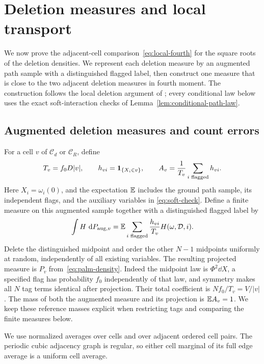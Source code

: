 \section{Deletion measures and local transport}
\label{sec:local-palm}

We now prove the adjacent-cell comparison~\eqref{eq:local-fourth} for
the square roots of the deletion densities.  We represent each deletion
measure by an augmented path sample with a distinguished flagged label,
then construct one measure that is close to the two adjacent deletion
measures in fourth moment.  The construction follows the local deletion argument of
\cite[Section~6]{D}; every conditional law below uses the exact
soft-interaction checks of Lemma~\ref{lem:conditional-path-law}.

\subsection{Augmented deletion measures and count errors}

For a cell $v$ of $\mathcal C_d$ or $\mathcal C_R$, define
\[
 T_v=f_0D|v|,\qquad h_{vi}=\mathbf 1_{\{X_i\in v\}},\qquad
 A_v=\frac1{T_v}\sum_{i\text{ flagged}}h_{vi}.
\]
Here $X_i=\omega_i(0)$, and the expectation $\mathbb E$ includes the ground
path sample, its independent flags, and the auxiliary variables in
\eqref{eq:soft-check}.  Define a finite measure on this augmented
sample together with a distinguished flagged label by
\[
 \int H\,\,\mathrm d P_{\mathrm{aug},v}
   =\mathbb E\sum_{i\text{ flagged}}\frac{h_{vi}}{T_v}H(\omega,\mathcal D,i).
\]
Delete the distinguished midpoint and order the other $N-1$ midpoints
uniformly at random, independently of all existing variables.  The
resulting projected measure is $P_v$ from~\eqref{eq:palm-density}.
Indeed the midpoint law is $\Phi^2\dd X$, a specified flag has
probability $f_0$ independently of that law, and symmetry makes all
$N$ tag terms identical after projection.  Their total coefficient
is $Nf_0/T_v=V/|v|$.  The mass of both the augmented measure and its
projection is $\mathbb E A_v=1$.  We keep these reference masses explicit
when restricting tags and comparing the finite measures below.

We use normalized averages over cells and over adjacent ordered cell
pairs.  The periodic cubic adjacency graph is regular, so either cell
marginal of its full edge average is a uniform cell average.

